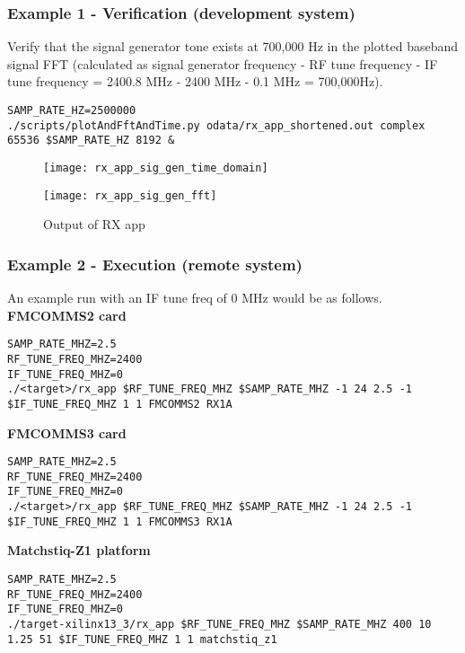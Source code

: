 \subsubsection{Example 1 - Verification (development system)}
Verify that the signal generator tone exists at 700,000 Hz in the plotted baseband signal FFT (calculated as signal generator frequency - RF tune frequency - IF tune frequency = 2400.8 MHz - 2400 MHz - 0.1 MHz = 700,000Hz).
\begin{lstlisting}
SAMP_RATE_HZ=2500000
./scripts/plotAndFftAndTime.py odata/rx_app_shortened.out complex 65536 $SAMP_RATE_HZ 8192 &
\end{lstlisting}
        \begin{figure}[H]
        \begin{minipage}{.5\textwidth}
                \texttt{[image: rx\_app\_sig\_gen\_time\_domain]}
                \label{fig:rx_app_sig_gen_time_domain}
        \end{minipage}%
        \begin{minipage}{.5\textwidth}
                \texttt{[image: rx\_app\_sig\_gen\_fft]}
        \end{minipage}
                \caption{Output of RX app}
                \label{fig:rx_app_sig_gen_fft}
        \end{figure}
\pagebreak
\subsubsection{Example 2 - Execution (remote system)}
An example run with an IF tune freq of 0 MHz would be as follows.
\\\noindent\textbf{FMCOMMS2 card}
\begin{lstlisting}
SAMP_RATE_MHZ=2.5
RF_TUNE_FREQ_MHZ=2400
IF_TUNE_FREQ_MHZ=0
./<target>/rx_app $RF_TUNE_FREQ_MHZ $SAMP_RATE_MHZ -1 24 2.5 -1 $IF_TUNE_FREQ_MHZ 1 1 FMCOMMS2 RX1A
\end{lstlisting}
\noindent\textbf{FMCOMMS3 card}
\begin{lstlisting}
SAMP_RATE_MHZ=2.5
RF_TUNE_FREQ_MHZ=2400
IF_TUNE_FREQ_MHZ=0
./<target>/rx_app $RF_TUNE_FREQ_MHZ $SAMP_RATE_MHZ -1 24 2.5 -1 $IF_TUNE_FREQ_MHZ 1 1 FMCOMMS3 RX1A
\end{lstlisting}
\noindent\textbf{Matchstiq-Z1 platform}
\begin{lstlisting}
SAMP_RATE_MHZ=2.5
RF_TUNE_FREQ_MHZ=2400
IF_TUNE_FREQ_MHZ=0
./target-xilinx13_3/rx_app $RF_TUNE_FREQ_MHZ $SAMP_RATE_MHZ 400 10 1.25 51 $IF_TUNE_FREQ_MHZ 1 1 matchstiq_z1
\end{lstlisting}
